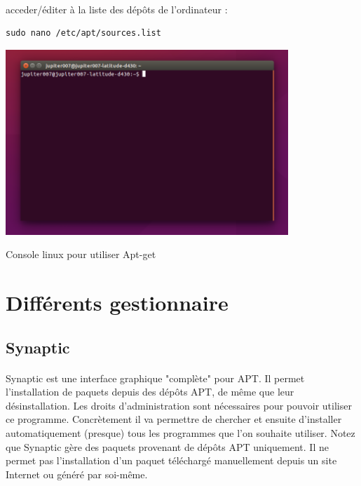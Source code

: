 \documentclass[a4paper,12pt]{article}
\begin{document}
\paragraph{}
acceder/éditer à la liste des dépôts de l'ordinateur :
\begin{verbatim}
sudo nano /etc/apt/sources.list
\end{verbatim}
\begin{center}

\includegraphics[width=0.8\textwidth]{terminal.png}
\end{center}
\begin{center}
 Console linux pour utiliser Apt-get
\end{center}

\clearpage
\section{Différents gestionnaire}
\subsection{Synaptic}
\paragraph{}
Synaptic est une interface graphique "complète" pour APT. Il permet l'installation de paquets depuis des dépôts APT, de même que leur désinstallation. Les droits d'administration sont nécessaires pour pouvoir utiliser ce programme.
Concrètement il va permettre de chercher et ensuite d'installer automatiquement (presque) tous les programmes que l'on souhaite utiliser. Notez que Synaptic gère des paquets ​provenant de dépôts APT uniquement. Il ne permet ​pas
l'​installation d'un paquet téléchargé manuellement depuis un site Internet ou généré par soi-même. ​
\end{document}
